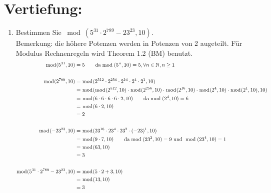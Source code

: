 



	\maketitle
	\section*{Vertiefung:}
	\begin{enumerate}[label=(\alph*)]
		\item  Bestimmen Sie $ \bmod(5^{31} \cdot 2^{789}-23^{23}, 10) $. \\
		Bemerkung: die h\"ohere Potenzen werden in Potenzen von 2 augeteilt. F\"ur Modulus Rechnenregeln wird Theorem 1.2 (BM) benutzt. 
		\begin{align*}
			\bmod(5^{31},10) &= 5  \textrm{\qquad da} \bmod(5^n,10)=5, \forall n \in \mathbb{N}, n\geq1
			\\\\
			\bmod(2^{789},10) &= \bmod(2^{512}\cdot2^{256}\cdot2^{16}\cdot2^4\cdot2^1,10) 
			\\&= \bmod(\bmod(2^{512},10)\cdot\bmod(2^{256},10)\cdot\bmod(2^{16},10)\cdot\bmod(2^4,10)\cdot\bmod(2^1,10),10)
			\\&= \bmod(6\cdot 6\cdot 6\cdot 6\cdot 2, 10) \textrm{\qquad da} \bmod(2^4,10)=6
			\\&= \bmod(6\cdot2,10) 
			\\&= 2 \\\\
			\bmod(-23^{23},10) &= \bmod(23^{16}\cdot23^{4}\cdot23^{2}\cdot(-23)^1,10) 
			\\&= \bmod(9\cdot 7, 10) \textrm{\qquad da} \bmod(23^2,10)=9 \textrm{ und } \bmod(23^4,10)=1
			\\&= \bmod(63,10) 
			\\&= 3 \\\\
			\bmod(5^{31} \cdot 2^{789}-23^{23}, 10) &= \bmod(5 \cdot 2 + 3,10)	
			\\&= \bmod(13,10) 
			\\&= 3
		\end{align*}


\end{enumerate}
